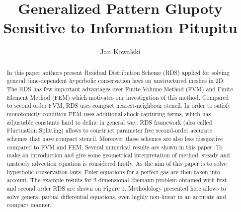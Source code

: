 \documentclass[plainboxedsections, 25pt, a1]{sciposter}
\title{Generalized Pattern Glupoty Sensitive to  Information Pitupitu}
\author{Jan Kowalski}
\institute{Department of Aerodynamics\\
Institute of Aeronautics and Applied Mechanics \\
Warsaw University of Technology 
}
\begin{document}
\pagestyle{fancy}




\maketitle



\begin{abstract}
In this paper authors present Residual Distribution Scheme (RDS) applied for solving general time-dependent hyperbolic conservation laws on unstructured meshes in 2D. 
	The RDS has few important advantages over Finite Volume Method (FVM) and Finite Element Method (FEM) which motivates our investigation of this method. Compared to second order FVM, RDS uses compact nearest-neighbour stencil. In order to satisfy monotonicity condition FEM uses additional shock capturing terms, which has adjustable constants hard to define in general way. RDS framework (also called Fluctuation Splitting) allows to construct parameter free second-order accurate schemes that have compact stencil. Moreover these schemes are also less dissipative compared to FVM and FEM.
	Several numerical results are shown in this paper. To make an introduction and give some geometrical interpretation of method, steady and unsteady advection equation is considered firstly. As the aim of this paper is to solve hyperbolic conservation laws, Euler equations for a perfect gas are then taken into account. The example results for 2-dimensional Riemann problem obtained with first and second order RDS are shown on Figure 1.
	Methodology presented here allows to solve general partial differential equations, even highly non-linear in an accurate and compact manner.
\end{abstract}
\end{document}
